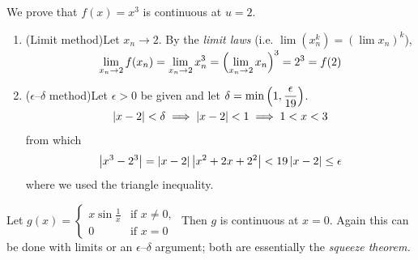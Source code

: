 \begin{examples}{}{}
	\exstart We prove that $f(x)=x^3$ is continuous at $u=2$.
	\begin{enumerate}\setcounter{enumi}{1}
		\item[]\begin{enumerate}
	  	\item (Limit method)\quad Let $x_n\to 2$. By the \emph{limit laws} (i.e. $\lim(x_n^k)=\left(\lim x_n\right)^k$),
			\[
				\lim_{x_n\to 2}f(x_n)=\lim_{x_n\to 2}x_n^3=\smash{\Bigl(\lim_{x_n\to 2}x_n\Bigr)^3}=2^3=f(2)
			\]
	  	\item ($\epsilon$--$\delta$ method)\quad Let $\epsilon>0$ be given and let $\displaystyle\delta=\smash{\min\left(1,\frac{\epsilon}{19}\right)}$.
			\[
				\left| x-2\right|<\delta\implies \left| x-2\right|<1\implies 1<x<3
			\]
			from which
			\[
				\left| x^3-2^3\right|		
				=\left| x-2\right|\left| x^2+2x+2^2\right|
				<19\left| x-2\right|\le\epsilon
			\]
			where we used the triangle inequality.
		\end{enumerate}
	
		\begin{minipage}[t]{0.70\linewidth}\vspace{0pt}
			\item Let $g(x)=
			\begin{cases}
				x\sin\frac 1x&\text{if }x\neq 0,\\
				0&\text{if }x=0
			\end{cases}$
			\smallbreak
			Then $g$ is continuous at $x=0$. Again this can be done with limits or an $\epsilon$--$\delta$ argument; both are essentially the \emph{squeeze theorem.}
	  

\end{minipage}
\end{enumerate}
\end{examples}
